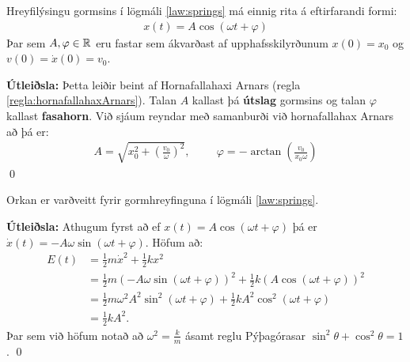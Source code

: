 \begin{tcolorbox}
\begin{theorem}
Hreyfilýsingu gormsins í lögmáli \ref{law:springs} má einnig rita á eftirfarandi formi:
\begin{align*}
    x(t) = A\cos(\omega t + \varphi)
\end{align*}
Þar sem $A, \varphi \in \mathbb{R}$ eru fastar sem ákvarðast af upphafsskilyrðunum $x(0) = x_0$ og $v(0) = \dot{x}(0) = v_0$.
\end{theorem}
\end{tcolorbox}

\textbf{Útleiðsla:} Þetta leiðir beint af Hornafallahaxi Arnars (regla \ref{regla:hornafallahaxArnars}). Talan $A$ kallast þá \textbf{útslag} gormsins og talan $\varphi$ kallast \textbf{fasahorn}. Við sjáum reyndar með samanburði við hornafallahax Arnars að þá er:
\begin{align*}
    A = \sqrt{x_0^2 + \left(\frac{v_0}{\omega}\right)^2}, \hspace{1cm} \varphi = -\arctan(\frac{v_0}{x_0\omega})
\end{align*}
\qed

\vspace{0.2cm}

\begin{tcolorbox}
\begin{theorem}
Orkan er varðveitt fyrir gormhreyfinguna í lögmáli \ref{law:springs}.
\end{theorem}
\end{tcolorbox}
\textbf{Útleiðsla:} Athugum fyrst að ef $x(t) = A\cos(\omega t + \varphi)$ þá er $\dot{x}(t) = -A\omega \sin(\omega t + \varphi)$. Höfum að:
\begin{align*}
    E(t) &= \frac{1}{2}m\dot{x}^2 + \frac{1}{2}kx^2 \\
    &= \frac{1}{2}m \left( -A\omega \sin(\omega t + \varphi)\right)^2  + \frac{1}{2}k\left(A \cos(\omega t + \varphi) \right)^2 \\
    &= \frac{1}{2}m \omega^2 A^2 \sin^2(\omega t + \varphi) + \frac{1}{2}k A^2\cos^2(\omega t + \varphi) \\
    &= \frac{1}{2}kA^2.
\end{align*}
Þar sem við höfum notað að $\omega^2 = \frac{k}{m}$ ásamt reglu Pýþagórasar $\sin^2\theta + \cos^2\theta = 1$.
\qed


